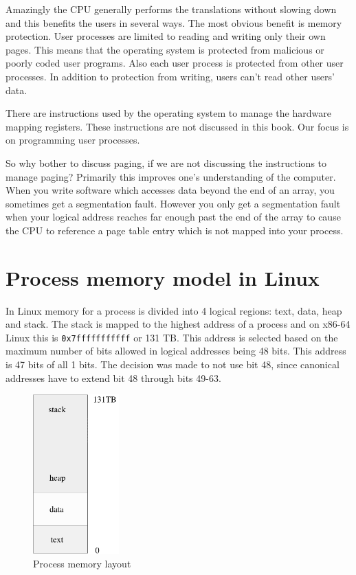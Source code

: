 \documentclass[11pt,b5paper]{book}
\begin{document}
Amazingly the CPU generally performs the translations without slowing down
and this benefits the users in several ways.
The most obvious benefit is memory protection.
User processes are limited to reading and writing only their own pages.
This means that the operating system is protected from malicious or poorly
coded user programs.
Also each user process is protected from other user processes.
In addition to protection from writing, users can't read other users' data.

There are instructions used by the operating system to manage the hardware
mapping registers.
These instructions are not discussed in this book.
Our focus is on programming user processes.

So why bother to discuss paging, if we are not discussing the instructions to
manage paging?
Primarily this improves one's understanding of the computer.
When you write software which accesses data beyond the end of an array, you
sometimes get a segmentation fault.
However you only get a segmentation fault when your logical address reaches
far enough past the end of the array to cause the CPU to reference a page
table entry which is not mapped into your process.

\section{Process memory model in Linux}

In Linux memory for a process is divided into 4 logical regions: text, data,
heap and stack.
The stack is mapped to the highest address of a process and on x86-64 Linux
this is {\tt 0x7fffffffffff} or 131 TB.
This address is selected based on the maximum number of bits allowed in
logical addresses being 48 bits.
This address is 47 bits of all 1 bits.
The decision was made to not use bit 48, since canonical addresses have to
extend bit 48 through bits 49-63.

\begin{figure}
\includegraphics[width=1.3in]{process_memory.pdf}
\caption{Process memory layout}
\label{process:memory}
\end{figure}
\end{document}
